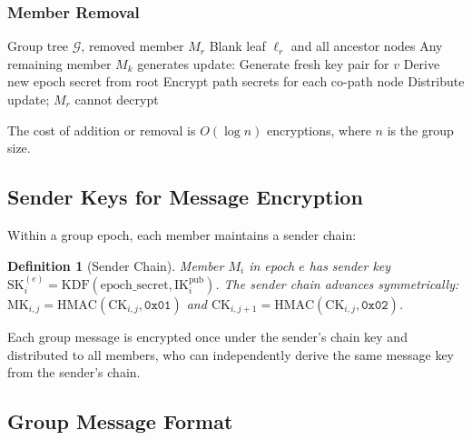 \documentclass[11pt,a4paper]{article}
\newtheorem{definition}{Definition}[section]
\begin{document}
\subsubsection{Member Removal}

\begin{algorithm}[H]
\caption{Remove Member from Group}
\label{alg:group-remove}
\begin{algorithmic}[1]
\Require Group tree $\mathcal{G}$, removed member $M_r$
\State Blank leaf $\ell_r$ and all ancestor nodes
\State Any remaining member $M_k$ generates update:
    \State Generate fresh key pair for $v$
\EndFor
\State Derive new epoch secret from root
\State Encrypt path secrets for each co-path node
\State Distribute update; $M_r$ cannot decrypt
\end{algorithmic}
\end{algorithm}

The cost of addition or removal is $O(\log n)$ encryptions, where $n$ is
the group size.

\subsection{Sender Keys for Message Encryption}

Within a group epoch, each member maintains a sender chain:

\begin{definition}[Sender Chain]
    Member $M_i$ in epoch $e$ has sender key
    $\mathrm{SK}_i^{(e)} = \mathrm{KDF}(\mathrm{epoch\_secret},
    \mathrm{IK}_i^{\mathrm{pub}})$.
    The sender chain advances symmetrically:
    $\mathrm{MK}_{i,j} = \mathrm{HMAC}(\mathrm{CK}_{i,j}, \texttt{0x01})$
    and $\mathrm{CK}_{i,j+1} = \mathrm{HMAC}(\mathrm{CK}_{i,j},
    \texttt{0x02})$.
\end{definition}

Each group message is encrypted once under the sender's chain key and
distributed to all members, who can independently derive the same
message key from the sender's chain.

\subsection{Group Message Format}
\end{document}
